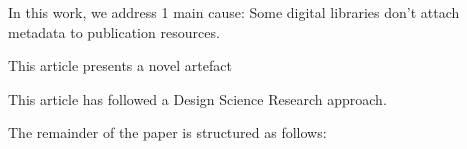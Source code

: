 \documentclass{article}
\begin{document}

    
In this work, we address 1 main cause: Some digital libraries don't attach metadata to publication resources. 
    
This article presents a novel artefact
    

    

      
This article has followed a Design Science Research approach.

The remainder of the paper is structured as follows: 

    
      


\end{document}
